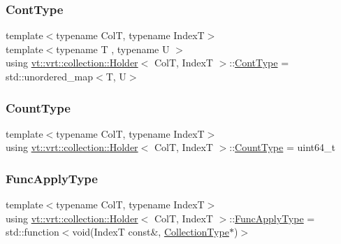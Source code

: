 \subsubsection{\texorpdfstring{Cont\+Type}{ContType}}
{\footnotesize\ttfamily template$<$typename ColT, typename IndexT$>$ \\
template$<$typename T , typename U $>$ \\
using \hyperlink{structvt_1_1vrt_1_1collection_1_1_holder}{vt\+::vrt\+::collection\+::\+Holder}$<$ ColT, IndexT $>$\+::\hyperlink{structvt_1_1vrt_1_1collection_1_1_holder_ae3bb115b69cf47e14a4e8441cebe9142}{Cont\+Type} =  std\+::unordered\+\_\+map$<$T, U$>$}

\mbox{\label{structvt_1_1vrt_1_1collection_1_1_holder_a3251a556ac19fc7dc4d0bd388cfaedeb}} 
\subsubsection{\texorpdfstring{Count\+Type}{CountType}}
{\footnotesize\ttfamily template$<$typename ColT, typename IndexT$>$ \\
using \hyperlink{structvt_1_1vrt_1_1collection_1_1_holder}{vt\+::vrt\+::collection\+::\+Holder}$<$ ColT, IndexT $>$\+::\hyperlink{structvt_1_1vrt_1_1collection_1_1_holder_a3251a556ac19fc7dc4d0bd388cfaedeb}{Count\+Type} =  uint64\+\_\+t}

\mbox{\label{structvt_1_1vrt_1_1collection_1_1_holder_a26e20d23447e935e218a07ffd638706d}} 
\subsubsection{\texorpdfstring{Func\+Apply\+Type}{FuncApplyType}}
{\footnotesize\ttfamily template$<$typename ColT, typename IndexT$>$ \\
using \hyperlink{structvt_1_1vrt_1_1collection_1_1_holder}{vt\+::vrt\+::collection\+::\+Holder}$<$ ColT, IndexT $>$\+::\hyperlink{structvt_1_1vrt_1_1collection_1_1_holder_a26e20d23447e935e218a07ffd638706d}{Func\+Apply\+Type} =  std\+::function$<$void(IndexT const\&, \hyperlink{structvt_1_1vrt_1_1collection_1_1_holder_a38b4a4bfc4408cf28918c32433c80aac}{Collection\+Type}$\ast$)$>$}

